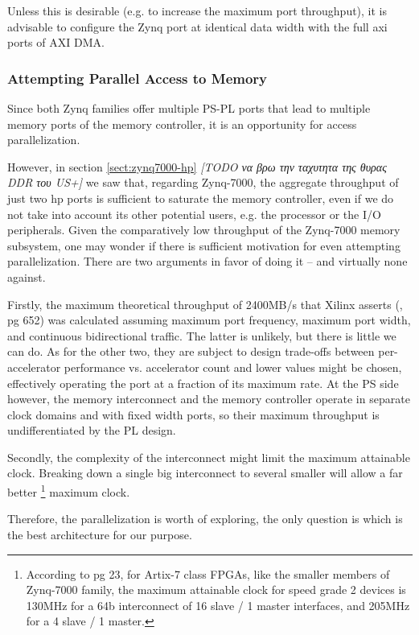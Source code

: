 Unless this is desirable (e.g. to increase the maximum port throughput),
it is advisable to configure the Zynq port at identical data width with the
full \gls{axi} ports of AXI DMA.

\subsubsection{Attempting Parallel Access to Memory}

Since both Zynq families offer multiple PS-PL ports that lead to
multiple memory ports of the memory controller,
it is an opportunity for access parallelization.

However, in section \ref{sect:zynq7000-hp}
\emph{[TODO να βρω την ταχυτητα της θυρας DDR του US+]}
we saw that, regarding Zynq-7000,
the aggregate throughput of just two \gls{hp} ports
is sufficient to saturate the memory controller,
even if we do not take into account its other potential users,
e.g. the processor or the I/O peripherals.
Given the comparatively low throughput of the Zynq-7000 memory subsystem,
one may wonder if there is sufficient motivation for even attempting parallelization.
There are two arguments in favor of doing it -- and virtually none against.

Firstly, the maximum theoretical throughput of 2400MB/s that Xilinx asserts (\cite{ug585}, pg 652)
was calculated assuming maximum port frequency, maximum port width, and continuous bidirectional
traffic. The latter is unlikely, but there is little we can do. As for the other two,
they are subject to design trade-offs between per-accelerator performance vs. accelerator count
and lower values might be chosen, effectively operating the port at a fraction of its
maximum rate. At the PS side however, the memory interconnect and the memory controller
operate in separate clock domains and with fixed width ports,
so their maximum throughput is undifferentiated by the PL design.

Secondly, the complexity of the interconnect might limit the maximum attainable clock.
Breaking down a single big interconnect to several smaller will allow a far better
	\footnote{
		According to \cite{pg059} pg 23, for Artix-7 class FPGAs,
		like the smaller members of Zynq-7000 family, the maximum attainable
		clock for speed grade 2 devices is 130MHz for a 64b interconnect of
		16 slave / 1 master interfaces, and 205MHz for a 4 slave / 1 master.
	}
maximum clock.

Therefore, the parallelization is worth of exploring, the only question is
which is the best architecture for our purpose.

